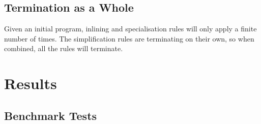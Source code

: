 \documentclass[preprint]{sigplanconf}
\begin{document}
\subsection{Termination as a Whole}

Given an initial program, inlining and specialisation rules will only apply a finite number of times. The simplification rules are terminating on their own, so when combined, all the rules will terminate.

\section{Results}
\label{sec:results}

\subsection{Benchmark Tests}
\end{document}
